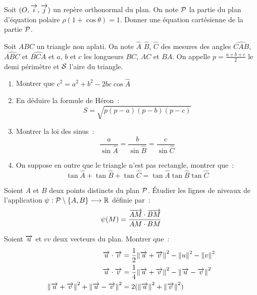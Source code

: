 \begin{exercice}
  Soit \((O, \vi, \vj)\) un repère orthonormal du plan. On note 
  \(\P\) la partie du plan d'équation polaire \(\rho(1 + 
  \cos\theta) = 1\). Donner une équation cartésienne de la partie 
  \(\P\).
\end{exercice}

\begin{exercice}
  Soit \(ABC\) un triangle non aplati. On note \(\hat{A}\) 
  \(\hat{B}\), \(\hat{C}\) des mesures des angles 
  \(\widehat{CAB}\), \(\widehat{ABC}\) et \(\widehat{BCA}\) et 
  \(a\), \(b\) et \(c\) les longueurs \(BC\), \(AC\) et \(BA\). On 
  appelle \(p = \frac{a + b + c}{2} \) le demi périmètre et \(\S\) 
  l'aire du triangle.
  \begin{enumerate}
    \item Montrer que \(c^2 = a^2 + b^2 - 2bc\cos \hat{A}\)
    \item En déduire la formule de Héron~:
      \begin{equation}
        S = \sqrt{p(p - a)(p - b)(p - c)}
      \end{equation}
    \item Montrer la loi des sinus~:
      \begin{equation}
        \frac{a}{\sin \hat{A}} = \frac{b}{\sin \hat{B}} = 
        \frac{c}{\sin \hat{C}}
      \end{equation}
    \item On suppose en outre que le triangle n'est pas rectangle, 
      montrer que~:
      \begin{equation}
        \tan \hat{A} + \tan \hat{B} + \tan \hat{C} = \tan \hat{A} 
        \tan \hat{B} \tan\hat{C}
      \end{equation}
  \end{enumerate}
\end{exercice}

\begin{exercice}
  Soient \(A\) et \(B\) deux points distincts du plan \(\P\). 
  Étudier les lignes de niveaux de l'application 
  \(\fonctionR{\psi}{\P\setminus\{A, B\}}{\R}\) définie par~:
  \begin{equation}
    \psi(M) = \frac{\vect{AM}\cdot\vect{BM}}{AM \cdot BM}
  \end{equation}
\end{exercice}

\begin{exercice}
  Soient \(\vu\) et \(vv\) deux vecteurs du plan. Montrer que~:
  \begin{align}
    \vu \cdot \vv &= \frac{1}{2}{\norme{\vu + \vv}^2 - \norme{u}^2 
    - \norme{v}^2} \\
      \vu \cdot \vv &= \frac{1}{4}{\norme{\vu + \vv}^2 - 
      \norme{\vu - \vv}^2} \\
        \norme{\vu + \vv}^2 + \norme{\vu - \vv}^2 &= 
        2(\norme{\vu}^2 + \norme{\vv}^2)
  \end{align}
\end{exercice}


